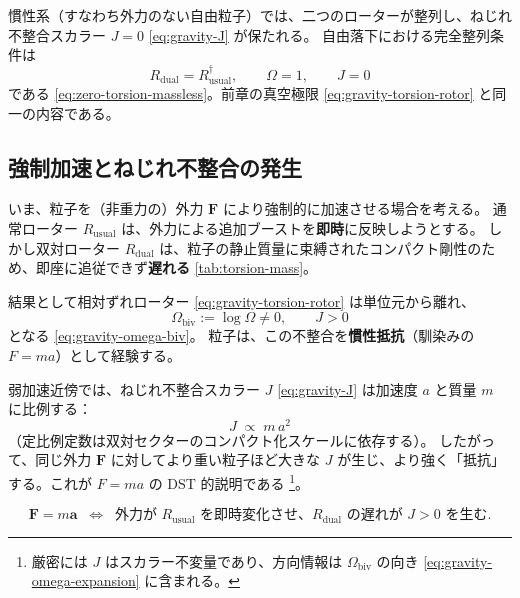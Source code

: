 \documentclass[dvipdfmx,a4paper,oneside]{jsbook}
\numberwithin{equation}{chapter}
\begin{document}
慣性系（すなわち外力のない自由粒子）では、二つのローターが整列し、ねじれ不整合スカラー \(J = 0\) \eqref{eq:gravity-J} が保たれる。
自由落下における完全整列条件は
\begin{equation}
  R_{\mathrm{dual}} = R_{\mathrm{usual}}^\dagger,
  \qquad
  \Omega = 1,
  \qquad
  J = 0
  \label{eq:inertia-free-fall}
\end{equation}
である \eqref{eq:zero-torsion-massless}。前章の真空極限 \eqref{eq:gravity-torsion-rotor} と同一の内容である。

\subsection{強制加速とねじれ不整合の発生}

いま、粒子を（非重力の）外力 \(\mathbf{F}\) により強制的に加速させる場合を考える。
通常ローター \(R_{\mathrm{usual}}\) は、外力による追加ブーストを\textbf{即時}に反映しようとする。
しかし双対ローター \(R_{\mathrm{dual}}\) は、粒子の静止質量に束縛されたコンパクト剛性のため、即座に追従できず\textbf{遅れる} \eqref{tab:torsion-mass}。

結果として相対ずれローター \eqref{eq:gravity-torsion-rotor} は単位元から離れ、
\begin{equation}
  \Omega_{\mathrm{biv}} := \log \Omega \neq 0,
  \qquad
  J > 0
  \label{eq:inertia-mismatch}
\end{equation}
となる \eqref{eq:gravity-omega-biv}。
粒子は、この不整合を\textbf{慣性抵抗}（馴染みの \(F = ma\)）として経験する。

弱加速近傍では、ねじれ不整合スカラー \(J\) \eqref{eq:gravity-J} は加速度 \(a\) と質量 \(m\) に比例する：
\begin{equation}
  J \;\propto\; m\, a^2
  \label{eq:inertia-J-ma}
\end{equation}
（定比例定数は双対セクターのコンパクト化スケールに依存する）。
したがって、同じ外力 \(\mathbf{F}\) に対してより重い粒子ほど大きな \(J\) が生じ、より強く「抵抗」する。これが \(F = ma\) の DST 的説明である \footnote{厳密には \(J\) はスカラー不変量であり、方向情報は \(\Omega_{\mathrm{biv}}\) の向き \eqref{eq:gravity-omega-expansion} に含まれる。}。

\begin{equation}
  \boxed{\;
  \mathbf{F} = m\mathbf{a}
  \;\;\Longleftrightarrow\;\;
  \text{外力が } R_{\mathrm{usual}} \text{ を即時変化させ、}
  R_{\mathrm{dual}} \text{ の遅れが } J > 0 \text{ を生む}.
  \;}
  \label{eq:inertia-F-ma}
\end{equation}
\end{document}
